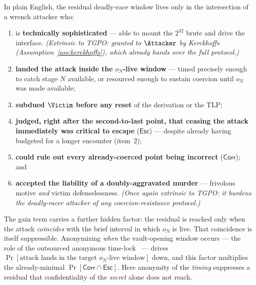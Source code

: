 \smallskip
\noindent In plain English, the residual deadly-race window lives only in the
intersection of a wrench attacker who:
\begin{enumerate}[nosep,leftmargin=1.9em]
  \item is \textbf{technically sophisticated} --- able to mount the $2^{32}$ brute
        and drive the interface. \emph{(Extrinsic to TGPO: granted to $\Attacker$
        by Kerckhoffs (Assumption~\ref{ass:kerckhoffs}), which already hands over
        the full protocol.)}
  \item \textbf{landed the attack inside the $o_N$-live window} --- timed
        precisely enough to catch stage $N$ available, or resourced enough to
        sustain coercion until $o_N$ was made available;
  \item \textbf{subdued $\Victim$ before any reset} of the derivation or the TLP;
  \item \textbf{judged, right after the second-to-last point, that ceasing the
        attack immediately was critical to escape} ($\mathsf{Esc}$) --- despite
        already having budgeted for a longer encounter (item~2);
  \item \textbf{could rule out every already-coerced point being incorrect}
        ($\mathsf{Corr}$); and
  \item \textbf{accepted the liability of a doubly-aggravated murder} --- frivolous
        motive \emph{and} victim defenselessness. \emph{(Once again extrinsic to
        TGPO: it burdens the deadly-racer attacker of any coercion-resistance
        protocol.)}
\end{enumerate}

\begin{remark}\label{rem:flying-turtle}
The gain term carries a further hidden factor: the residual is reached only when
the attack \emph{coincides} with the brief interval in which $o_N$ is live. That
coincidence is itself suppressible. Anonymizing \emph{when} the vault-opening
window occurs --- the role of the outsourced anonymous
time-lock~\cite{gw-flyingturtle} --- drives
$\Pr[\text{attack lands in the target } o_N\text{-live window}]$ down, and this factor
multiplies the already-minimal $\Pr[\mathsf{Corr}\cap\mathsf{Esc}]$. Here anonymity
of the \emph{timing} suppresses a residual that confidentiality of the \emph{secret}
alone does not reach.
\end{remark}

